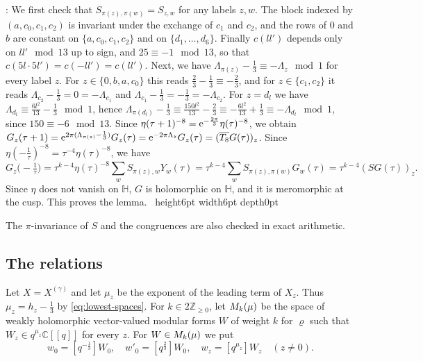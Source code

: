 \documentclass[leqno]{article}
\newcommand{\Cbb}{\ensuremath{\mathbb{C}}}
\let\cal\relax
\newcommand{\cal}{\mathcal}
\newcommand{\Z}{\ensuremath{\mathbb{Z}}}
\renewcommand{\geq}{\ensuremath{\geqslant}}
\newcommand{\qed}{\hfill \vrule height6pt  width6pt depth0pt}
\newcommand{\ovl}{\overline}
\let\i\relax
\newcommand{\i}{\mathrm{i}}
\newcommand{\e}{\mathrm{e}}
\newenvironment{proof}[1][]{\noindent {\it Proof #1} : }{\hbox{~}\qed
\smallskip
}
\numberwithin{equation}{section}
\begin{document}
\begin{proof}
We first check that $S_{\pi(z),\pi(w)} = S_{z,w}$ for any labels $z,w$. The block indexed by $(a,c_0,c_1,c_2)$ is invariant under the exchange of $c_1$ and $c_2$, and the rows of $0$ and $b$ are constant on $\{a,c_0,c_1,c_2\}$ and on $\{d_1,\ldots,d_6\}$. Finally $c(ll')$ depends only on $ll' \mod 13$ up to sign, and $25 \equiv -1 \mod 13$, so that $c(5l \cdot 5l') = c(-ll') = c(ll')$. Next, we have $\Lambda_{\pi(z)}-\frac13 \equiv -\Lambda_z \mod 1$ for every label $z$. For $z \in \{0,b,a,c_0\}$ this reads $\frac23-\frac13 \equiv -\frac23$, and for $z \in \{c_1,c_2\}$ it reads $\Lambda_{c_2}-\frac13 = 0 = -\Lambda_{c_1}$ and $\Lambda_{c_1}-\frac13 = -\frac13 = -\Lambda_{c_2}$. For $z = d_l$ we have $\Lambda_{d_l} \equiv \frac{6l^2}{13}-\frac13 \mod 1$, hence $\Lambda_{\pi(d_l)}-\frac13 \equiv \frac{150l^2}{13}-\frac23 \equiv -\frac{6l^2}{13}+\frac13 \equiv -\Lambda_{d_l} \mod 1$, since $150 \equiv -6 \mod 13$. Since $\eta(\tau+1)^{-8} = \e^{-\frac{2\pi\i}{3}}\eta(\tau)^{-8}$, we obtain $G_z(\tau+1) = \e^{2\pi\i(\Lambda_{\pi(z)}-\frac13)}G_z(\tau) = \e^{-2\pi\i\Lambda_z}G_z(\tau) = (\ovl{T_8}G(\tau))_z$. Since $\eta(-\frac1\tau)^{-8} = \tau^{-4}\eta(\tau)^{-8}$, we have
\[
G_z\big(-\tfrac1\tau\big)
= \tau^{k-4}\eta(\tau)^{-8}\sum_w S_{\pi(z),w}Y_w(\tau)
= \tau^{k-4}\sum_{w} S_{\pi(z),\pi(w)}G_w(\tau)
= \tau^{k-4}(SG(\tau))_z.
\]
Since $\eta$ does not vanish on $\mathbb H$, $G$ is holomorphic on $\mathbb H$, and it is meromorphic at the cusp. This proves the lemma.
\end{proof}

The $\pi$-invariance of $S$ and the congruences are also checked in exact arithmetic.

\subsection{The relations}

Let $X = X^{(\gamma)}$ and let $\mu_z$ be the exponent of the leading term of $X_z$. Thus $\mu_z = h_z-\frac13$ by \eqref{eq:lowest-spaces}. For $k \in 2\Z_{\geq 0}$, let $\cal M_k(\mu)$ be the space of weakly holomorphic vector-valued modular forms $W$ of weight $k$ for $\varrho$ such that $W_z \in q^{\mu_z}\Cbb[[q]]$ for every $z$. For $W \in \cal M_k(\mu)$ we put
\begin{equation}
\label{eq:functionals}
w_0 = [q^{-\frac13}]W_0,\quad w'_0 = [q^{\frac23}]W_0,\quad w_z = [q^{\mu_z}]W_z \quad (z \neq 0).
\end{equation}
\end{document}
